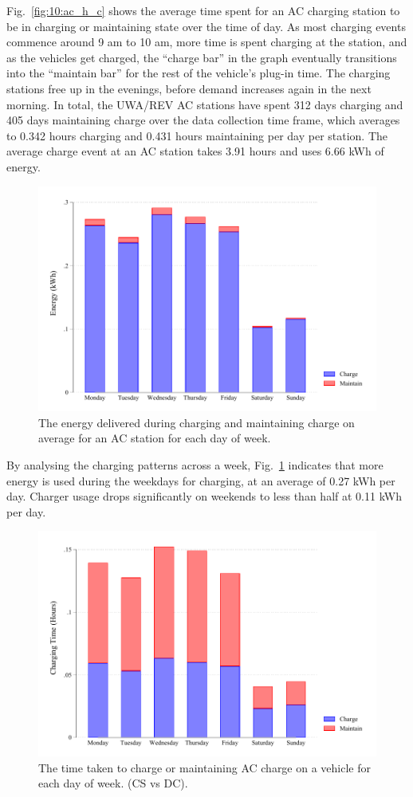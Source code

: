 Fig.~\ref{fig:10:ac_h_c} shows the average time spent for an AC charging station to be in charging or maintaining state over the time of day. As most charging events commence around 9 am to 10 am, more time is spent charging at the station, and as the vehicles get charged, the ``charge bar'' in the graph eventually transitions into the ``maintain bar'' for the rest of the vehicle's plug-in time. The charging stations free up in the evenings, before demand increases again in the next morning. In total, the UWA/REV AC stations have spent 312 days charging and 405 days maintaining charge over the data collection time frame, which averages to 0.342 hours charging and 0.431 hours maintaining per day per station. The average charge event at an AC station takes 3.91 hours and uses 6.66 kWh of energy.

\begin{figure}[H]
	\centering
	\includegraphics[width=0.8\linewidth]{ac_d_e}
	\caption[Energy delivered for an AC station for each day of week]{The energy delivered during charging and maintaining charge on average for an AC station for each day of week.}
	\label{fig:10:ac_d_e}
\end{figure}

By analysing the charging patterns across a week, Fig.~\ref{fig:10:ac_d_e} indicates that more energy is used during the weekdays for charging, at an average of 0.27 kWh per day. Charger usage drops significantly on weekends to less than half at 0.11 kWh per day. 

\begin{figure}[H]
	\centering
	\includegraphics[width=0.8\linewidth]{ac_d_h}
	\caption[Time taken to AC charge a vehicle for each day of week]{The time taken to charge or maintaining AC charge on a vehicle for each day of week. (CS vs DC).}
	\label{fig:10:ac_d_h}
\end{figure}


